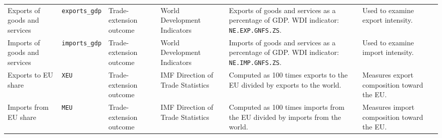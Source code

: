 \documentclass[a4paper]{article}
\begin{document}
\begin{landscape}
\begin{longtable}{P{3cm}P{3cm}P{3cm}P{3cm}P{4.4cm}P{5.2cm}}
Exports of goods and services
& \texttt{exports\_gdp}
& Trade-extension outcome
& World Development Indicators
& Exports of goods and services as a percentage of GDP. WDI indicator: \texttt{NE.EXP.GNFS.ZS}.
& Used to examine export intensity. \\

Imports of goods and services
& \texttt{imports\_gdp}
& Trade-extension outcome
& World Development Indicators
& Imports of goods and services as a percentage of GDP. WDI indicator: \texttt{NE.IMP.GNFS.ZS}.
& Used to examine import intensity. \\

Exports to EU share
& \texttt{XEU}
& Trade-extension outcome
& IMF Direction of Trade Statistics
& Computed as 100 times exports to the EU divided by exports to the world.
& Measures export composition toward the EU. \\

Imports from EU share
& \texttt{MEU}
& Trade-extension outcome
& IMF Direction of Trade Statistics
& Computed as 100 times imports from the EU divided by imports from the world.
& Measures import composition toward the EU. \\

\bottomrule
\end{longtable}


\end{landscape}
\end{document}
